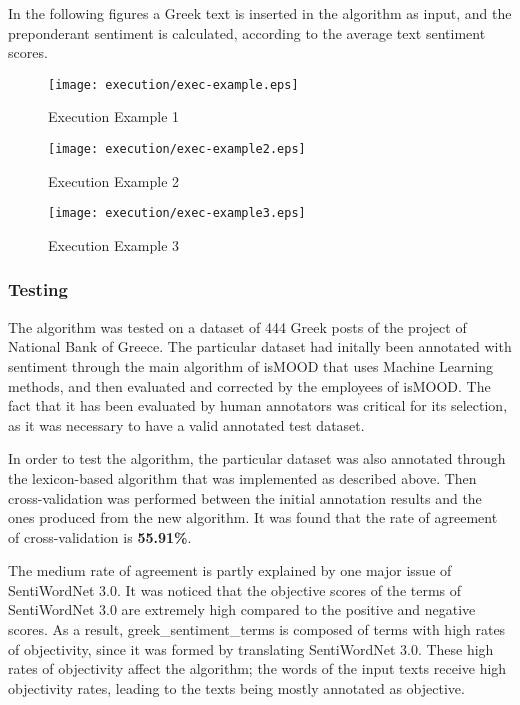 In the following figures
a Greek text is inserted in the algorithm as input,
and the preponderant sentiment is calculated,
according to the average text sentiment scores.

\begin{figure}[ht]
\centering
\texttt{[image: execution/exec-example.eps]}
\caption{Execution Example 1}
\label{fig:exec-example}
\end{figure}

\begin{figure}[ht]
\centering
\texttt{[image: execution/exec-example2.eps]}
\caption{Execution Example 2}
\label{fig:exec-example2}
\end{figure}

\begin{figure}[ht]
\centering
\texttt{[image: execution/exec-example3.eps]}
\caption{Execution Example 3}
\label{fig:exec-example3}
\end{figure}

\clearpage

\subsubsection{Testing}
\label{subsubsec:testing}

The algorithm was tested on a dataset of 444 Greek posts
of the project of National Bank of Greece.
The particular dataset had initally been annotated with sentiment
through the main algorithm of isMOOD that uses Machine Learning methods,
and then evaluated and corrected by the employees of isMOOD.
The fact that it has been evaluated by human annotators
was critical for its selection,
as it was necessary to have a valid annotated test dataset.

In order to test the algorithm,
the particular dataset was also annotated
through the lexicon-based algorithm that was implemented
as described above.
Then cross-validation was performed between
the initial annotation results
and the ones produced from the new algorithm.
It was found that the rate of agreement of cross-validation
is \textbf{55.91\%}.

The medium rate of agreement is partly explained
by one major issue of SentiWordNet 3.0.
It was noticed that the objective scores
of the terms of SentiWordNet 3.0 are extremely high
compared to the positive and negative scores.
As a result, greek\_sentiment\_terms is composed
of terms with high rates of objectivity,
since it was formed by translating SentiWordNet 3.0.
These high rates of objectivity affect the algorithm;
the words of the input texts receive high objectivity rates,
leading to the texts being mostly annotated as objective.

